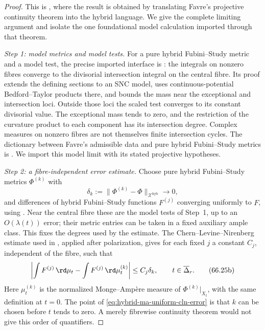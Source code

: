 \begin{proof}
This is \cite[Theorem~4.11]{PS23Hybrid}, where the result is obtained by
translating Favre's projective continuity theorem into the hybrid language.
We give the complete limiting argument and isolate the one foundational
model calculation imported through that theorem.

\smallskip
\noindent\emph{Step 1: model metrics and model tests.}
For a pure hybrid Fubini--Study metric and a model test, the precise
imported interface is \cite[Theorem~3.4]{Favre20Hybrid}: the integrals on
nonzero fibres converge to the divisorial intersection integral on the
central fibre. Its proof extends the defining sections to an SNC model,
uses continuous-potential Bedford--Taylor products there, and bounds the
mass near the exceptional and intersection loci. Outside those loci the
scaled test converges to its constant divisorial value. The exceptional
mass tends to zero, and the restriction of the curvature product to each
component has its intersection degree. Complex measures on nonzero
fibres are not themselves finite intersection cycles. The dictionary
between Favre's admissible data and pure hybrid Fubini--Study metrics is
\cite[Lemma~4.10 and Theorem~4.11]{PS23Hybrid}. We import this model limit
with its stated projective hypotheses.

\smallskip
\noindent\emph{Step 2: a fibre-independent error estimate.}
Choose pure hybrid Fubini--Study metrics $\Phi^{(k)}$ with
\[
            \delta_k:=
            \|\Phi^{(k)}-\Phi\|_{\mathcal X^{\mathrm{hyb}}}
            \longrightarrow0,
\tag{66.25a}\label{eq:hybrid-ma-uniform-metric-error}
\]
and differences of hybrid Fubini--Study functions $F^{(j)}$ converging
uniformly to $F$, using \cite[Theorem~2.16]{PS23Hybrid}.
Near the central fibre these are the model tests of Step~1, up to an
$O(\lambda(t))$ error; their metric entries can be taken in a fixed
auxiliary ample class. This fixes the degrees used by the estimate.  The
Chern--Levine--Nirenberg estimate used in
\cite[Lemma~4.10 and Theorem~4.11]{PS23Hybrid}, applied after polarization,
gives for each fixed $j$ a constant $C_j$, independent of the fibre,
such that
\[
 \left|
  \int F^{(j)}\,\rd\mu_t-
  \int F^{(j)}\,\rd\mu_t^{(k)}
 \right|
 \leq C_j\delta_k,
 \qquad t\in\overline\Delta_r.
\tag{66.25b}\label{eq:hybrid-ma-uniform-cln-error}
\]
Here $\mu_t^{(k)}$ is the normalized Monge--Amp\`ere measure of
$\Phi^{(k)}|_{X_t}$, with the same definition at $t=0$.  The point of
\eqref{eq:hybrid-ma-uniform-cln-error} is that $k$ can be chosen before
$t$ tends to zero.  A merely fibrewise continuity theorem would not give
this order of quantifiers.


\end{proof}
